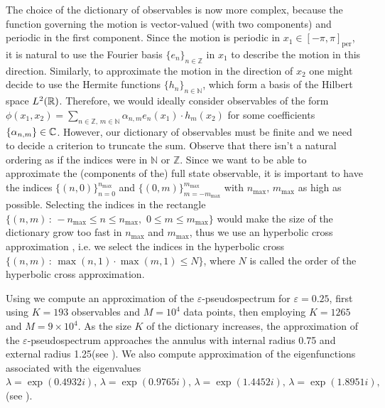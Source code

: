 The choice of the dictionary of observables is now more complex, because the function governing the motion is vector-valued (with two components) and periodic in the first component. Since the motion is periodic in $x_1\in[-\pi,\pi]_{\text{per}}$, it is natural to use the Fourier basis $\{e_n\}_{n\in\mathbb{Z}}$ in $x_1$ to describe the motion in this direction. Similarly, to approximate the motion in the direction of $x_2$ one might decide to use the Hermite functions $\{h_n\}_{n\in\mathbb{N}}$, which form a basis of the Hilbert space $L^2(\mathbb{R})$. Therefore, we would ideally consider observables of the form $\phi(x_1, x_2) = \sum_{n\in\mathbb{Z},\,m\in\mathbb{N}} \alpha_{n,m} e_n(x_1)\cdot h_m(x_2)$ for some coefficients $\{\alpha_{n,m}\}\in\mathbb{C}$. However, our dictionary of observables must be finite and we need to decide a criterion to truncate the sum. Observe that there isn't a natural ordering as if the indices were in $\mathbb{N}$ or $\mathbb{Z}$. Since we want to be able to approximate the (components of the) full state observable, it is important to have the indices $\{(n,0)\}_{n=0}^{n_{\max}}$ and $\{(0,m)\}_{m=-m_{\max}}^{m_{\max}}$ with $n_{\max},\,m_{\max}$ as high as possible. Selecting the indices in the rectangle $\{(n,m)\,:\,-n_{\max}\leq n\leq n_{\max},\,\, 0\leq m\leq m_{\max}\}$ would make the size of the dictionary grow too fast in $n_{\max}$ and $m_{\max}$, thus we use an hyperbolic cross approximation \cite{dung_hyperbolic_2017}, i.e. we select the indices in the hyperbolic cross $\{(n,m)\,:\, \max(n,1)\cdot \max(m,1)\leq N \}$, where $N$ is called the order of the hyperbolic cross approximation.

Using  we compute an approximation of the $\varepsilon$-pseudospectrum for $\varepsilon = 0.25$, first using $K=193$ observables and $M = 10^4$ data points, then employing $K=1265$ and $M = 9 \times 10^4$. As the size $K$ of the dictionary increases, the approximation of the $\varepsilon$-pseudospectrum approaches the annulus with internal radius 0.75 and external radius 1.25(see ). We also compute approximation of the eigenfunctions associated with the eigenvalues $\lambda = \exp(0.4932 i), \,\lambda = \exp(0.9765 i), \,\lambda = \exp(1.4452 i), \,\lambda = \exp(1.8951 i), \,$ (see ).


